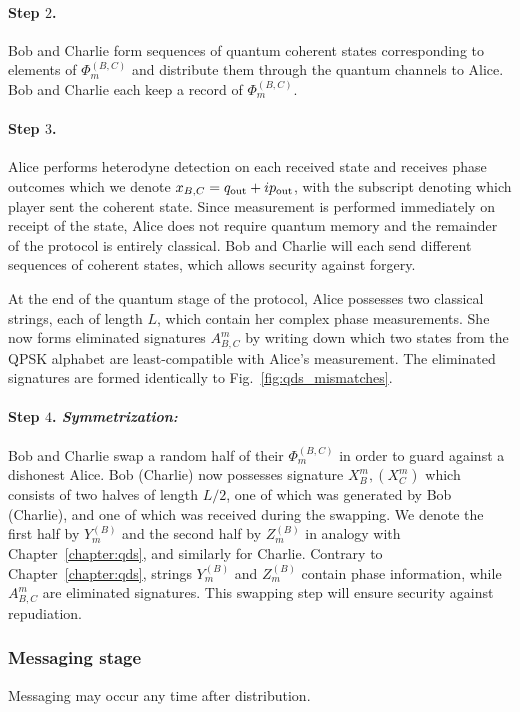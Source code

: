 \paragraph{Step $2$.} Bob and Charlie form sequences of quantum coherent states corresponding to elements of $\Phi_m^{\left(B, C\right)}$ and distribute them through the quantum channels to Alice. Bob and Charlie each keep a record of $\Phi_m^{\left(B, C\right)}$.

\paragraph{Step $3$.} Alice performs heterodyne detection on each received state and receives phase outcomes which we denote $x_{B, C} = q_{\text{out}} + i p_{\text{out}}$, with the subscript denoting which player sent the coherent state. Since measurement is performed immediately on receipt of the state, Alice does not require quantum memory and the remainder of the protocol is entirely classical. Bob and Charlie will each send different sequences of coherent states, which allows security against forgery.

At the end of the quantum stage of the protocol, Alice possesses two classical strings, each of length $L$, which contain her complex phase measurements. She now forms eliminated signatures $A_{B, C}^m$ by writing down which two states from the QPSK alphabet are least-compatible with Alice's measurement. The eliminated signatures are formed identically to Fig.~\ref{fig:qds_mismatches}.

\paragraph{Step $4$. \emph{Symmetrization:}} Bob and Charlie swap a random half of their $\Phi_m^{\left(B, C\right)}$ in order to guard against a dishonest Alice. Bob (Charlie) now possesses signature $X_B^m, \left(X_C^m\right)$ which consists of two halves of length $L/2$, one of which was generated by Bob (Charlie), and one of which was received during the swapping. We denote the first half by $Y_m^{\left(B\right)}$ and the second half by $Z_m^{\left(B\right)}$ in analogy with Chapter~\ref{chapter:qds}, and similarly for Charlie. Contrary to Chapter~\ref{chapter:qds}, strings $Y_m^{\left(B\right)}$ and $Z_m^{\left(B\right)}$ contain phase information, while $A_{B, C}^m$ are eliminated signatures. This swapping step will ensure security against repudiation.

\subsubsection{Messaging stage}
Messaging may occur any time after distribution.

